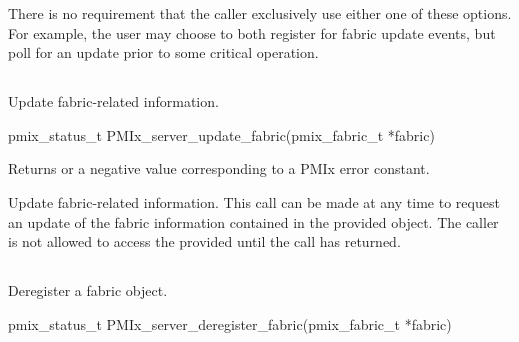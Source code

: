 There is no requirement that the caller exclusively use either one of these options. For example, the user may choose to both register for fabric update events, but poll for an update prior to some critical operation.

\subsection{}

\summary

Update fabric-related information.

\format

\cspecificstart
\begin{codepar}
pmix_status_t
PMIx_server_update_fabric(pmix_fabric_t *fabric)
\end{codepar}
\cspecificend

\begin{arglist}
\end{arglist}

Returns  or a negative value corresponding to a \ac{PMIx} error constant.

\descr

Update fabric-related information. This call can be made at any time to request an update of the fabric information contained in the provided  object. The caller is not allowed to access the provided  until the call has returned.


\subsection{}

\summary

Deregister a fabric object.

\format

\cspecificstart
\begin{codepar}
pmix_status_t PMIx_server_deregister_fabric(pmix_fabric_t *fabric)
\end{codepar}
\cspecificend

\begin{arglist}
\end{arglist}

